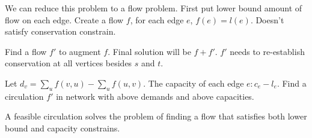 We can reduce this problem to a flow problem. First put lower bound amount of flow on each edge. Create a flow $f$, for each edge $e$, $f(e) = l(e)$. Doesn't satisfy conservation constrain.

Find a flow $f'$ to augment $f$. Final solution will be $f+f'$. $f'$ needs to re-establish conservation at all vertices besides $s$ and $t$. 

Let $d_v = \sum_{u} f(v, u) - \sum_u f(u, v)$. The capacity of each edge $e: c_e - l_e$. Find a circulation $f'$ in network with above demands and above capacities.

A feasible circulation solves the problem of finding a flow that satisfies both lower bound and capacity constrains.













